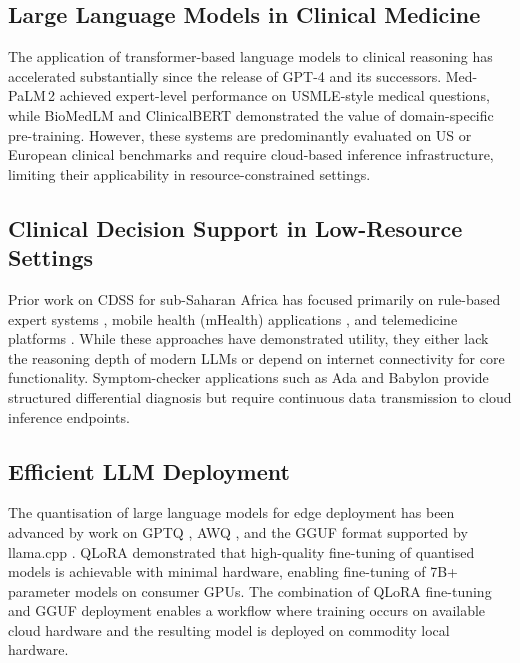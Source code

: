 \documentclass[conference]{IEEEtran}
\begin{document}
\subsection{Large Language Models in Clinical Medicine}

The application of transformer-based language models to clinical
reasoning has accelerated substantially since the release of
GPT-4 \cite{openai2023gpt4} and its successors. Med-PaLM\,2
\cite{singhal2023medpalm2} achieved expert-level performance on
USMLE-style medical questions, while BioMedLM \cite{bolton2022biomedlm}
and ClinicalBERT \cite{huang2019clinicalbert} demonstrated the value
of domain-specific pre-training. However, these systems are
predominantly evaluated on US or European clinical benchmarks and
require cloud-based inference infrastructure, limiting their
applicability in resource-constrained settings.

\subsection{Clinical Decision Support in Low-Resource Settings}

Prior work on CDSS for sub-Saharan Africa has focused primarily on
rule-based expert systems \cite{fraser2007clinician}, mobile health
(mHealth) applications \cite{labrique2013mhealth}, and telemedicine
platforms \cite{bastawrous2015ehealth}. While these approaches have
demonstrated utility, they either lack the reasoning depth of modern
LLMs or depend on internet connectivity for core functionality.
Symptom-checker applications such as Ada \cite{ada2020} and Babylon
\cite{babylon2020} provide structured differential diagnosis but
require continuous data transmission to cloud inference endpoints.

\subsection{Efficient LLM Deployment}

The quantisation of large language models for edge deployment has
been advanced by work on GPTQ \cite{frantar2022gptq},
AWQ \cite{lin2023awq}, and the GGUF format supported by
llama.cpp \cite{gerganov2023llamacpp}. QLoRA \cite{dettmers2023qlora}
demonstrated that high-quality fine-tuning of quantised models is
achievable with minimal hardware, enabling fine-tuning of 7B+
parameter models on consumer GPUs. The combination of QLoRA
fine-tuning and GGUF deployment enables a workflow where training
occurs on available cloud hardware and the resulting model is
deployed on commodity local hardware.
\end{document}
